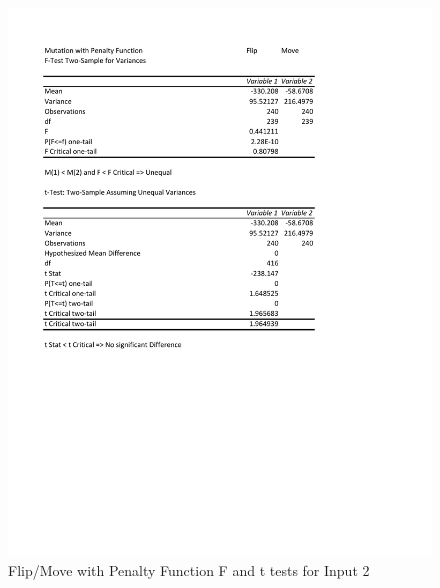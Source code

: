 \documentclass[times]{article}
\begin{document}
	\begin{figure}
		\caption{Flip/Move with Penalty Function F and t tests for Input 2}
		\label{fig:flip_move_penalty2}
		\includegraphics[width=\textwidth]{./t_test/mutation_penalty2}
	\end{figure}
\end{document}
